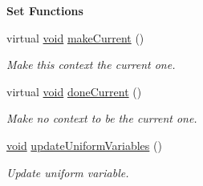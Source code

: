 \begin{Indent}{\bf Set Functions}\par
\begin{DoxyCompactItemize}
\item 
virtual \hyperlink{group___u_a_v_objects_plugin_ga444cf2ff3f0ecbe028adce838d373f5c}{void} \hyperlink{class_g_l_c___context_a5760f8d403610237234dc405231e4979}{make\-Current} ()
\begin{DoxyCompactList}\small\item\em Make this context the current one. \end{DoxyCompactList}\item 
virtual \hyperlink{group___u_a_v_objects_plugin_ga444cf2ff3f0ecbe028adce838d373f5c}{void} \hyperlink{class_g_l_c___context_ac3e1b22a80e6809654895aba111b1b6c}{done\-Current} ()
\begin{DoxyCompactList}\small\item\em Make no context to be the current one. \end{DoxyCompactList}\item 
\hyperlink{group___u_a_v_objects_plugin_ga444cf2ff3f0ecbe028adce838d373f5c}{void} \hyperlink{class_g_l_c___context_afae3929b966a3e98c9a1c615accb6880}{update\-Uniform\-Variables} ()
\begin{DoxyCompactList}\small\item\em Update uniform variable. \end{DoxyCompactList}\end{DoxyCompactItemize}
\end{Indent}
